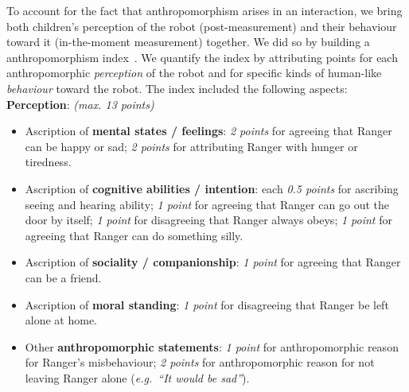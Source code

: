 \documentclass{sig-alternate}
\newcommand{\eg}{{\textit{e.g.~}}}
\begin{document}
%
To account for the fact that anthropomorphism arises in an interaction, we bring
both children's perception of the robot (post-measurement) and their behaviour
toward it (in-the-moment measurement) together. We did so by building a
anthropomorphism index~\cite{fink2014dynamics}. We quantify the
index by attributing points for each anthropomorphic \emph{perception} of the
robot and for specific kinds of human-like \emph{behaviour}
toward the robot. The index included the following aspects:\\

\textbf{Perception}: \textit{(max. 13 points)}

\begin{itemize}
    \item Ascription of \textbf{mental states / feelings}: \textit{2 points} for agreeing
            that Ranger can be happy or sad; \textit{2 points} for attributing Ranger with
        hunger or tiredness.

    \item Ascription of \textbf{cognitive abilities / intention}: each \textit{0.5
        points} for ascribing seeing and hearing ability; \textit{1 point} for agreeing
            that Ranger can go out the door by itself; \textit{1 point} for disagreeing that
            Ranger always obeys; \textit{1 point} for agreeing that Ranger can do something
        silly.

    \item Ascription of \textbf{sociality / companionship}: \textit{1 point} for agreeing
        that Ranger can be a friend.

    \item Ascription of \textbf{moral standing}: \textit{1 point} for disagreeing that
        Ranger be left alone at home.

    \item Other \textbf{anthropomorphic statements}: \textit{1 point} for anthropomorphic
        reason for Ranger's misbehaviour; \textit{2 points} for anthropomorphic reason
        for not leaving Ranger alone (\eg \textit{``It would be sad''}).

\end{itemize}
\end{document}
